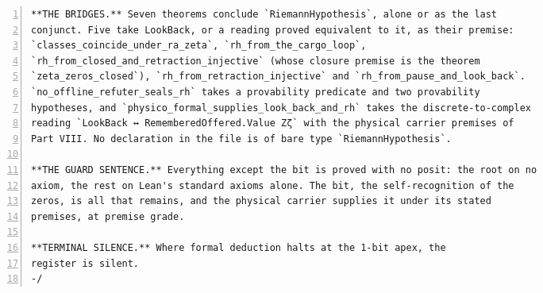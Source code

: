 \documentclass[10pt]{article}
\newcommand{\eom}{\par\vspace{10pt}\noindent{\color{accent}\rule{\textwidth}{0.4pt}}\par\vspace{3pt}\noindent{\small\bfseries\scshape End of manuscript}\par}
\newcommand{\leansize}{\fontsize{5.5pt}{6.75pt}\selectfont}
\begin{document}
\begin{multicols}{2}
\begin{Verbatim}[numbers=left,firstnumber=1,numbersep=3pt,xleftmargin=2.6em,breaklines=true,breakanywhere=true,breakautoindent=false,breakindent=1.4em,breaksymbolleft={},breakanywheresymbolpre={},fontsize=\leansize]
**THE BRIDGES.** Seven theorems conclude `RiemannHypothesis`, alone or as the last
conjunct. Five take LookBack, or a reading proved equivalent to it, as their premise:
`classes_coincide_under_ra_zeta`, `rh_from_the_cargo_loop`,
`rh_from_closed_and_retraction_injective` (whose closure premise is the theorem
`zeta_zeros_closed`), `rh_from_retraction_injective` and `rh_from_pause_and_look_back`.
`no_offline_refuter_seals_rh` takes a provability predicate and two provability
hypotheses, and `physico_formal_supplies_look_back_and_rh` takes the discrete-to-complex
reading `LookBack ↔ RememberedOffered.Value Zζ` with the physical carrier premises of
Part VIII. No declaration in the file is of bare type `RiemannHypothesis`.

**THE GUARD SENTENCE.** Everything except the bit is proved with no posit: the root on no
axiom, the rest on Lean's standard axioms alone. The bit, the self-recognition of the
zeros, is all that remains, and the physical carrier supplies it under its stated
premises, at premise grade.

**TERMINAL SILENCE.** Where formal deduction halts at the 1-bit apex, the
register is silent.
-/
\end{Verbatim}
\end{multicols}
\endgroup

\eom
\end{document}
